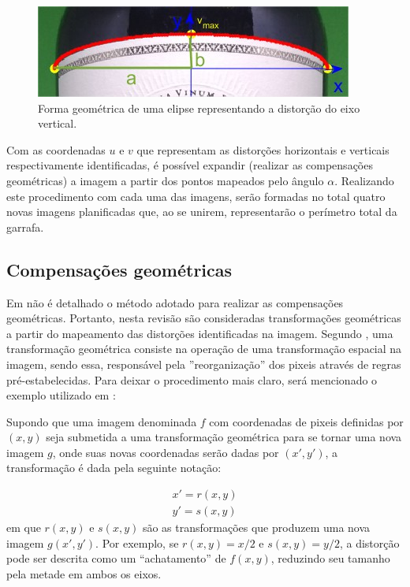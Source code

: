 \begin{figure}[htb]
    \caption{Forma geométrica de uma elipse representando a distorção do eixo vertical.}
    \centering
    \vspace{0.3cm}
    \begin{minipage}{.5\textwidth}
      \centering
         \includegraphics[width=.95\linewidth]{TCC/Imagens/ellipse_apre.jpg}
	\end{minipage}
    \label{fig:bottle_ellipse}
\end{figure}

Com as coordenadas $u$ e $v$ que representam as distorções horizontais e verticais respectivamente identificadas, é possível expandir (realizar as compensações geométricas) a imagem a partir dos pontos mapeados pelo ângulo $\alpha$. Realizando este procedimento com cada uma das imagens, serão formadas no total quatro novas imagens planificadas que, ao se unirem, representarão o perímetro total da garrafa.

\subsection{Compensações geométricas}

Em \cite{Lin:2013} não é detalhado o método adotado para realizar as compensações geométricas. Portanto, nesta revisão são consideradas transformações geométricas a partir do mapeamento das distorções identificadas na imagem. Segundo \cite{Gonzales:2000}, uma transformação geométrica consiste na operação de uma transformação espacial na imagem, sendo essa, responsável pela ''reorganização'' dos pixeis através de regras pré-estabelecidas. Para deixar o procedimento mais claro, será mencionado o exemplo utilizado em \cite{Gonzales:2000}:

Supondo que uma imagem denominada $f$ com coordenadas de pixeis definidas por $(x,y)$ seja submetida a uma transformação geométrica para se tornar uma nova imagem $g$, onde suas novas coordenadas serão dadas por $(x',y')$, a transformação é dada pela seguinte notação:

\begin{equation}
    \begin{array}{l}
        x'= r(x,y) \\
        y'= s(x,y)
    \end{array}
\end{equation}
em que $r(x,y)$ e $s(x,y)$ são as transformações que produzem uma nova imagem $g(x', y')$. Por exemplo, se $r(x,y) = {x}/{2}$ e $s(x,y) = {y}/{2}$, a distorção pode ser descrita como um ``achatamento'' de $f(x, y)$, reduzindo seu tamanho pela metade em ambos os eixos.

